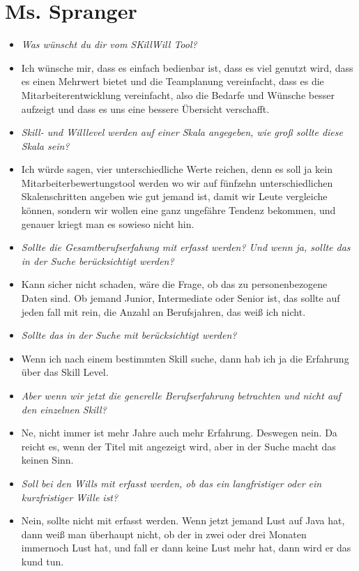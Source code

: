 \section{Ms. Spranger}
\begin{itemize}
\item[] \textit{Was wünscht du dir vom SKillWill Tool?}
\item[] Ich wünsche mir, dass es einfach bedienbar ist, dass es viel genutzt wird, dass es einen Mehrwert bietet und die Teamplanung vereinfacht, dass es die Mitarbeiterentwicklung vereinfacht, also die Bedarfe und Wünsche besser aufzeigt und dass es uns eine bessere Übersicht verschafft.

\item[] \textit{Skill- und Willlevel werden auf einer Skala angegeben, wie groß sollte diese Skala sein?}
\item[] Ich würde sagen, vier unterschiedliche Werte reichen, denn es soll ja kein Mitarbeiterbewertungstool werden wo wir auf fünfzehn unterschiedlichen Skalenschritten angeben wie gut jemand ist, damit wir Leute vergleiche können, sondern wir wollen eine ganz ungefähre Tendenz bekommen, und genauer kriegt man es sowieso nicht hin.

\item[] \textit{Sollte die Gesamtberufserfahung mit erfasst werden? Und wenn ja, sollte das in der Suche berücksichtigt werden?}
\item[] Kann sicher nicht schaden, wäre die Frage, ob das zu personenbezogene Daten sind. Ob jemand Junior, Intermediate oder Senior ist, das sollte auf jeden fall mit rein, die Anzahl an Berufsjahren, das weiß ich nicht.

\item[] \textit{Sollte das in der Suche mit berücksichtigt werden?}
\item[] Wenn ich nach einem bestimmten Skill suche, dann hab ich ja die Erfahrung über das Skill Level.

\item[] \textit{Aber wenn wir jetzt die generelle Berufserfahrung betrachten und nicht auf den einzelnen Skill?}
\item[] Ne, nicht immer ist mehr Jahre auch mehr Erfahrung. Deswegen nein. Da reicht es, wenn der Titel mit angezeigt wird, aber in der Suche macht das keinen Sinn.

\item[] \textit{Soll bei den Wills mit erfasst werden, ob das ein langfristiger oder ein kurzfristiger Wille ist?}
\item[] Nein, sollte nicht mit erfasst werden. Wenn jetzt jemand Lust auf Java hat, dann weiß man überhaupt nicht, ob der in zwei oder drei Monaten immernoch Lust hat, und fall er dann keine Lust mehr hat, dann wird er das kund tun.


\end{itemize}
